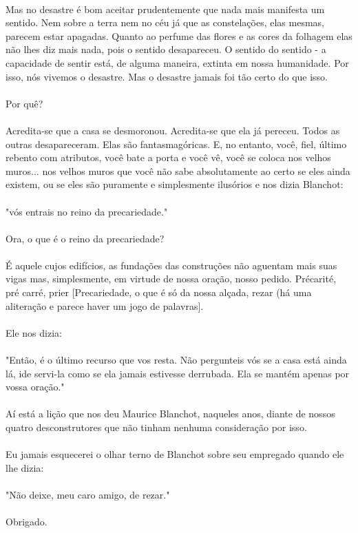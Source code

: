 \documentclass[10pt,a4paper]{book}
\begin{document}
	\\
	Mas no desastre é bom aceitar prudentemente que nada mais manifesta um sentido. Nem sobre a terra nem no céu já que as constelações, elas mesmas, parecem  estar apagadas. Quanto ao perfume das flores e as cores da folhagem elas não lhes diz mais nada, pois o sentido desapareceu. O sentido do sentido - a capacidade de sentir está, de alguma maneira, extinta em nossa humanidade. Por isso, nós vivemos o desastre. Mas o desastre jamais foi tão certo do que isso.\\
	\\
	Por quê?\\
	\\
	Acredita-se que a casa se desmoronou. Acredita-se que ela já pereceu. Todos as outras desapareceram. Elas são fantasmagóricas. E, no entanto, você, fiel, último rebento com atributos, você bate a porta e você vê, você se coloca nos velhos muros... nos velhos muros que você não sabe absolutamente ao certo se eles ainda existem, ou se eles são puramente e simplesmente ilusórios e nos dizia Blanchot: \\
	\\
	"vós entrais no reino da precariedade."\\
	\\
	Ora, o que é o reino da precariedade?\\
	\\
	É aquele cujos edifícios, as fundações das construções não aguentam mais suas vigas mas, simplesmente, em virtude de nossa oração, nosso pedido. Précarité, pré carré, prier [Precariedade, o que é só da nossa alçada, rezar (há uma aliteração e parece haver um jogo de palavras].\\
	\\
	Ele nos dizia: \\
	\\
	"Então, é o último recurso que vos resta. Não pergunteis vós se a casa está ainda lá, ide servi-la como se ela jamais estivesse derrubada. Ela se mantém apenas por vossa oração."\\
	\\
	Aí está a lição que nos deu Maurice Blanchot, naqueles anos, diante de nossos quatro desconstrutores que não tinham nenhuma consideração por isso.\\
	\\
	Eu jamais esquecerei o olhar terno de Blanchot sobre seu empregado quando ele lhe dizia:\\
	\\
	"Não deixe, meu caro amigo, de rezar." \\
	\\
	Obrigado.
\end{document}
